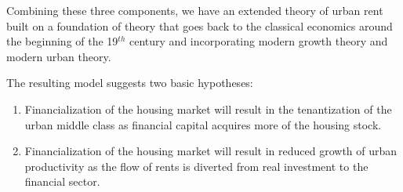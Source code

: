 Combining these three components, we have an extended theory of urban rent built on a foundation of theory that goes back to the \gls{classical economics} around the beginning of the 19$^{th}$ century and incorporating modern growth theory and modern urban theory. 

The resulting model suggests two basic hypotheses:
\begin{enumerate}
    \item Financialization of the housing market will result in the tenantization of the urban middle class as financial capital acquires more of the housing stock. %
    \item Financialization of the housing market will result in reduced growth of urban productivity as the flow of rents is diverted from real investment to the financial sector.
\end{enumerate} 
 
